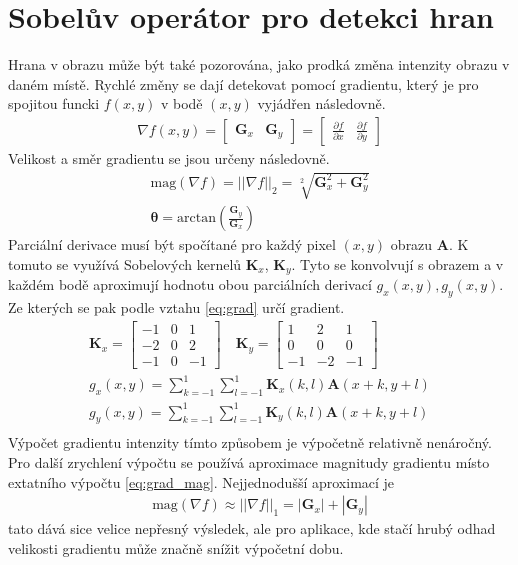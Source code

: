 \documentclass[twoside]{ctuthesis}
\newcommand{\tl}[1]{$\mathbf{#1}$}
\begin{document}
\section{Sobelův operátor pro detekci hran}
\label{subsec:sobel}
Hrana v obrazu může být také pozorována, jako prodká změna intenzity obrazu v daném místě. Rychlé změny se dají detekovat pomocí gradientu, který je pro spojitou funcki $f(x,y)$ v bodě $(x,y)$ vyjádřen následovně. 
\begin{align}
    \nabla f(x,y) =  \begin{bmatrix} \mathbf{G}_x & \mathbf{G}_y \end{bmatrix} = \begin{bmatrix} \frac{\partial f}{\partial x} & \frac{\partial f}{\partial y} \end{bmatrix} \label{eq:grad}
\end{align}
Velikost a směr gradientu se jsou určeny následovně.
\begin{align}
    \text{mag}(\nabla f) = ||\nabla f ||_2 = \sqrt[2]{\mathbf{G}_x ^2 + \mathbf{G}_y ^2} \label{eq:grad_mag} \\
    \boldsymbol{\theta} = \text{arctan} (\frac{\mathbf{G}_y}{\mathbf{G}_x})
\end{align}
Parciální derivace musí být spočítané pro každý pixel $(x,y)$ obrazu \tl{A}. K tomuto se využívá Sobelových kernelů $\mathbf{K}_x$, $\mathbf{K}_y$. Tyto se konvolvují s obrazem a v každém bodě aproximují hodnotu obou parciálních derivací $g_x(x,y), g_y(x,y)$. Ze kterých se pak podle vztahu \ref{eq:grad} určí gradient.
\begin{align}
    \mathbf{K}_x = \begin{bmatrix} -1 & 0 & 1 \\ -2 & 0 &2 \\ -1 & 0 & -1 \end{bmatrix} \quad \mathbf{K}_y = \begin{bmatrix} 1 & 2 & 1 \\ 0 & 0 & 0 \\ -1 & -2 & -1 \end{bmatrix} \\
    g_x(x,y) = \sum_{k = -1}^1 \sum_{l = -1}^1 \mathbf{K}_x(k,l)\mathbf{A}(x+k, y+l) \\
    g_y(x,y) = \sum_{k = -1}^1 \sum_{l = -1}^1 \mathbf{K}_y(k,l)\mathbf{A}(x+k, y+l) \\
\end{align}
Výpočet gradientu intenzity tímto způsobem je výpočetně relativně nenáročný. Pro další zrychlení výpočtu se používá aproximace magnitudy gradientu místo extatního výpočtu \ref{eq:grad_mag}. Nejjednodušší aproximací je 
\begin{align}
    \text{mag}(\nabla f) \approx ||\nabla f ||_1 = |\mathbf{G}_x| + |\mathbf{G}_y|  
\end{align}
tato dává sice velice nepřesný výsledek, ale pro aplikace, kde stačí hrubý odhad velikosti gradientu může značně snížit výpočetní dobu.
\end{document}
